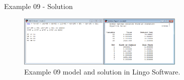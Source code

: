 \begin{frame}{Example 09 - Solution}
\begin{figure}
    \includegraphics[width=300px]{slides/ex09/screenshot.png}
    \caption{Example 09 model and solution in Lingo Software.}
\end{figure}
\end{frame}
